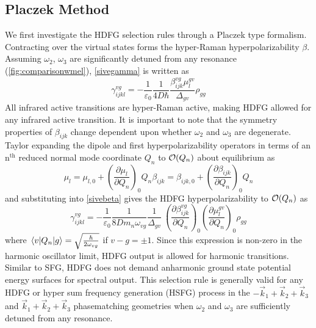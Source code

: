 \documentclass[aip, jcp, reprint, onecolumn]{revtex4-2}
\begin{document}
\subsection{Placzek Method}
We first investigate the HDFG selection rules through a Placzek type formalism.
Contracting over the virtual states forms the hyper-Raman hyperpolarizability $\beta$.\cite{Long1970} 
Assuming $\omega_2$, $\omega_3$ are significantly detuned from any resonance (\autoref{fig:comparisonwmel}),\cite{Placzek1934, Long1970, Altmann1982} \autoref{sivegamma} is written as 
\begin{equation}\label{sivebeta}
	\gamma_{ijkl}^{vg} =	-\frac{1}{\varepsilon_0} \frac{1}{4D \hbar}\frac{\beta^{vg}_{ijk} \mu^{gv}_{l}}{\Delta_{gv}} \rho_{gg}
\end{equation}
All infrared active transitions are hyper-Raman active, making HDFG allowed for any infrared active transition. \cite{Andrews1978}
It is important to note that the symmetry properties of $\beta_{ijk}$ change dependent upon whether $\omega_2$ and $\omega_3$ are degenerate. \cite{Denisov1986, Kozich2007}
Taylor expanding the dipole and first hyperpolarizability operators in terms of an n$^{\text{th}}$ reduced normal mode coordinate $Q_n$ to $\order{Q_n}$ about equilibrium as\cite{Long1970, Shen90}
\begin{subequations}
	\begin{equation}
		\mu_l = \mu_{l,0} + \left(\frac{\partial \mu_l}{\partial Q_n}\right)_0 Q_n 
	\end{equation}
	\begin{equation}
		\beta_{ijk} = \beta_{ijk,0} + \left(\frac{\partial \beta_{ijk}}{\partial Q_n}\right)_0 Q_n
	\end{equation}
\end{subequations}
and substituting into \autoref{sivebeta} gives the HDFG hyperpolarizability to $\order{Q_n}$ as \begin{equation}\label{SIVEselection}
	\gamma_{ijkl}^{vg} =	-\frac{1}{\varepsilon_0} \frac{1}{8D m_n \omega_{vg}}  \frac{1}{{\Delta_{gv}}} \ \left(\frac{\partial \beta^{vg}_{ijk}}{\partial Q_n}\right)_0 \left({\frac{\partial \mu^{gv}_{l}}{\partial Q_n}}\right)_0  \rho_{gg}
\end{equation}
where $\mel{v}{Q_n}{g} = \sqrt{\frac{\hbar}{2\omega_{vg}}}$ if $v-g = \pm 1$.  \cite{RN230}
Since this expression is non-zero in the harmonic oscillator limit, HDFG output is allowed for harmonic transitions. 
Similar to SFG, HDFG does not demand anharmonic ground state potential energy surfaces for spectral output. \cite{Shen94, Cho2000}
This selection rule is generally valid for any HDFG or hyper sum frequency generation (HSFG) process in the $-\vec{k}_1 + \vec{k}_2  + \vec{k}_3$ and $\vec{k}_1 + \vec{k}_2  + \vec{k}_3$ phasematching geometries when $\omega_2$ and $\omega_3$ are sufficiently detuned from any resonance.
\end{document}
